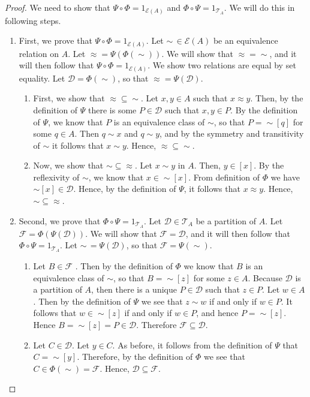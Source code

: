 \documentclass[a4paper,english,12pt]{article}
\begin{document}
\begin{proof} We need to show that $\Psi \circ \Phi = 1_{\mathcal{E}(A)}$ and $\Phi \circ \Psi = 1_{\mathcal{T}_A}$. We will do this in following steps.
\begin{enumerate}
	\item First, we prove that $\Psi \circ \Phi = 1_{\mathcal{E}(A)}$. Let $\sim \, \in \mathcal{E}(A)$ be an equivalence relation on $A$. Let $\approx = \Psi(\Phi(\sim))$. We will show that $\approx = \sim$, and it will then follow that $\Psi \circ \Phi = 1_{\mathcal{E}(A)}$.  We show two relations are equal by set equality. Let $\mathcal{D} = \Phi(\sim)$, so that $\approx  = \Psi(\mathcal{D})$.	
	\begin{enumerate}
	\item First, we show that $\approx \subseteq \sim$. Let $x,y \in A$ such that $x \approx y$. Then, by the definition of $\Psi$ there is some $P \in \mathcal{D}$ such that $x,y \in P$. By the definition of $\Psi$, we know that $P$ is an equivalence class of $\sim$, so that $P = \sim[q]$ for some $q \in A.$ Then $q \sim x$ and $q \sim y$, and by the symmetry and transitivity of $\sim$ it follows that $x \sim y$. Hence, ${\approx} \subseteq {\sim}$.
	\item Now, we show that $\sim \subseteq \approx$. Let $x \sim y$ in $A$. Then, $y \in [x]$. By the reflexivity of $\sim$, we know that $x \in \sim[x]$. From definition of $\Phi$ we have $\sim[x] \in \mathcal{D}$. Hence, by the definition of $\Psi$, it follows that $x \approx y$. Hence, ${\sim} \subseteq {\approx}$.
	\end{enumerate} 
	\item Second, we prove that $\Phi \circ \Psi = 1_{\mathcal{T}_A}$. Let $\mathcal{D} \in \mathcal{T}_A$ be a partition of $A$. Let $\mathcal{F} = \Phi(\Psi(\mathcal{D}))$. We will show that $\mathcal{F} = \mathcal{D}$, and it will then follow that $\Phi \circ \Psi = 1_{\mathcal{T}_A}$. Let $\sim \, = \Psi(\mathcal{D})$, so that $\mathcal{F} = \Psi(\sim)$. 
	\begin{enumerate}
	\item Let $B \in \mathcal{F}$ . Then by the definition of $\Phi$ we know that $B$ is an equivalence class of $\sim$, so that $B = \sim[z]$ for some $z \in A$. Because $\mathcal{D}$ is a partition of $A$, then there is a unique $P \in \mathcal{D}$ such that $z \in P$. Let $w \in A$. Then by the definition of $\Psi$ we see that $z \sim w$ if and only if $w \in P$. It follows that $w \in \sim[z]$ if and only if $w \in P$, and hence $P = \sim[z]$. Hence $B = \sim[z] = P \in \mathcal{D}$. Therefore $\mathcal{F} \subseteq \mathcal{D}$.
	\item Let $C \in \mathcal{D}$. Let $y \in C$. As before, it follows from the definition of $\Psi$ that $C = \sim[y]$. Therefore, by the definition of $\Phi$ we see that $C \in \Phi(\sim) = \mathcal{F}$. Hence, $\mathcal{D} \subseteq \mathcal{F}$. %
	\end{enumerate} 
\end{enumerate} 	
\end{proof}
\end{document}
